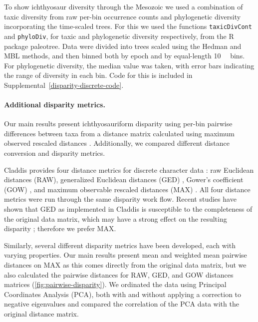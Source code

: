 \documentclass[british,a4paper]{article}
\newcommand\pcref[1]{(\cref{#1})}
\begin{document}
To show ichthyosaur diversity through the Mesozoic we used a combination of taxic diversity from raw per-bin occurrence counts and phylogenetic diversity incorporating the time-scaled trees. For this we used the functions \texttt{taxicDivCont} and \texttt{phyloDiv}, for taxic and phylogenetic diversity respectively, from the R package paleotree\autocite{Bapst2012}. Data were divided into trees scaled using the Hedman and MBL methods, and then binned both by epoch and by equal-length \SI{10}{\mega\annum} bins. For phylogenetic diversity, the median value was taken, with error bars indicating the range of diversity in each bin. Code for this is included in Supplemental~\ref{disparity-discrete-code}.

\paragraph{Additional disparity metrics.}

Our main results present ichthyosauriform disparity using per-bin pairwise differences between taxa from a distance matrix calculated using maximum observed rescaled distances \autocite{Lloyd2016}. Additionally, we compared different distance conversion and disparity metrics.

Claddis provides four distance metrics for discrete character data \autocite{Lloyd2016}: raw Euclidean distances (RAW), generalized Euclidean distances (GED) \autocite{Wills1994}, Gower's coefficient (GOW) \autocite{Gower1971}, and maximum observable rescaled distances (MAX) \autocite{Lloyd2016}. All four distance metrics were run through the same disparity work flow. Recent studies have shown that GED as implemented in Claddis is susceptible to the completeness of the original data matrix, which may have a strong effect on the resulting disparity \autocite{Flannery-Sutherland2019, Lehmann2019}; therefore we prefer MAX.

Similarly, several different disparity metrics have been developed, each with varying properties. Our main results present mean and weighted mean pairwise distances on MAX as this comes directly from the original data matrix, but we also calculated the pairwise distances for RAW, GED, and GOW distances matrices \pcref{fig:pairwise-disparity}. We ordinated the data using Principal Coordinates Analysis (PCA), both with and without applying a correction to negative eigenvalues \autocite{Caillez1983} and compared the correlation of the PCA data with the original distance matrix. 
\end{document}
